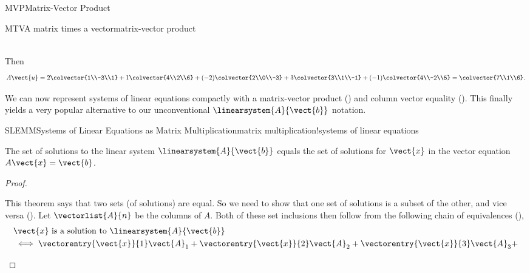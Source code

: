 \begin{subsect}{MVP}{Matrix-Vector Product}
\begin{example}{MTV}{A matrix times a vector}{matrix-vector product}
\begin{para}
\begin{align*}
\end{align*}\end{para}
%
\begin{para}Then
%
\begin{equation*}
A\vect{u}=
2\colvector{1\\-3\\1}+
1\colvector{4\\2\\6}+
(-2)\colvector{2\\0\\-3}+
3\colvector{3\\1\\-1}+
(-1)\colvector{4\\-2\\5}
=
\colvector{7\\1\\6}.
\end{equation*}
\end{para}
%
\end{example}
%
\begin{para}We can now represent systems of linear equations compactly with a matrix-vector product () and column vector equality ().  This finally yields a very popular alternative to our unconventional $\linearsystem{A}{\vect{b}}$ notation.\end{para}
%
\begin{theorem}{SLEMM}{Systems of Linear Equations as Matrix Multiplication}{matrix multiplication!systems of linear equations}
\begin{para}The set of solutions to the linear system $\linearsystem{A}{\vect{b}}$ equals the set of solutions for $\vect{x}$ in the vector equation $A\vect{x}=\vect{b}$.\end{para}
\end{theorem}
%
\begin{proof}
\begin{para}This theorem says that two sets (of solutions) are equal.  So we need to show that one set of solutions is a subset of the other, and vice versa ().  Let $\vectorlist{A}{n}$ be the columns of $A$.  Both of these set inclusions then follow from the following chain of equivalences (),
%
\begin{align*}
&\vect{x}\text{ is a solution to }\linearsystem{A}{\vect{b}}\\
&\iff
\vectorentry{\vect{x}}{1}\vect{A}_1+
\vectorentry{\vect{x}}{2}\vect{A}_2+
\vectorentry{\vect{x}}{3}\vect{A}_3+

\end{align*}
\end{para}
\end{proof}
\end{subsect}

